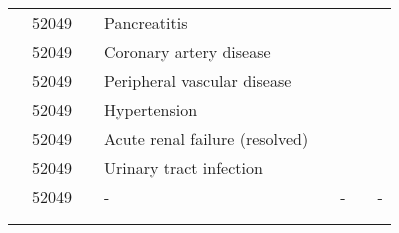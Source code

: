 \documentclass[dvips, 10pt]{article}
\begin{document}
\begin{table}[t]
\begin{center}
\begin{tabular}{ @{}l@{}
@{}l@{}@{}p{1.5em}@{}@{}p{1.75in}@{}@{}p{1.5em}@{}@{}p{1.75in}@{}@{}p{1.5em}@{}@{}p{1.75in}@{}
}
& 52049 && Pancreatitis &&  &&  \\
& 52049 && Coronary artery disease &&  &&  \\
& 52049 && Peripheral vascular disease &&  &&  \\
& 52049 && Hypertension &&  &&  \\
& 52049 && Acute renal failure (resolved) &&  &&  \\
& 52049 && Urinary tract infection &&  &&  \\
& 52049 && - && - && - \\
\\
\hline \\

\end{tabular}

\end{center}
 \end{table}
\end{document}
